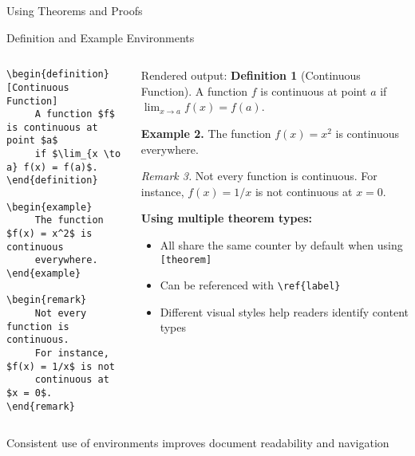 \begin{frame}[fragile]{Using Theorems and Proofs}
\end{frame}

\begin{frame}[fragile]{Definition and Example Environments}
     \begin{columns}
          \begin{column}{0.5\textwidth}
       \begin{lstlisting}[basicstyle=\footnotesize\ttfamily]
\begin{definition}[Continuous Function]
     A function $f$ is continuous at point $a$
     if $\lim_{x \to a} f(x) = f(a)$.
\end{definition}

\begin{example}
     The function $f(x) = x^2$ is continuous
     everywhere.
\end{example}

\begin{remark}
     Not every function is continuous.
     For instance, $f(x) = 1/x$ is not 
     continuous at $x = 0$.
\end{remark}
               \end{lstlisting}
          \end{column}
          
          \begin{column}{0.5\textwidth}
               \begin{block}{Rendered output:}
                    \textbf{Definition 1} (Continuous Function). A function $f$ is continuous at point $a$ if $\lim_{x \to a} f(x) = f(a)$.
                    
                    \textbf{Example 2.} The function $f(x) = x^2$ is continuous everywhere.
                    
                    \textit{Remark 3.} Not every function is continuous. For instance, $f(x) = 1/x$ is not continuous at $x = 0$.
               \end{block}
               
               \textbf{Using multiple theorem types:}
               \begin{itemize}
                    \item All share the same counter by default when using \texttt{[theorem]}
                    \item Can be referenced with \texttt{\textbackslash ref\{label\}}
                    \item Different visual styles help readers identify content types
               \end{itemize}
          \end{column}
     \end{columns}
     
     \begin{tip}
          Consistent use of environments improves document readability and navigation
     \end{tip}
\end{frame}

